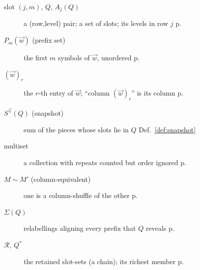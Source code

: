 \begin{description}
\item[slot $(j,m)$, $Q$, $A_j(Q)$] a (row,level) pair; a set of slots; its levels in row $j$ \dotfill p.~\pageref{def:slot}
\item[$P_m(\vec w)$ (prefix set)] the first $m$ symbols of $\vec w$, unordered \dotfill p.~\pageref{def:prefix}
\item[$(\vec w)_r$] the $r$-th entry of $\vec w$; ``column $(\vec w)_r$'' is its column \dotfill p.~\pageref{def:wr}
\item[$S^{\vec v}(Q)$ (snapshot)] sum of the pieces whose slots lie in $Q$ \dotfill Def.~\ref{def:snapshot}
\item[multiset] a collection with repeats counted but order ignored \dotfill p.~\pageref{def:multiset}
\item[$M\sim M'$ (column-equivalent)] one is a column-shuffle of the other \dotfill p.~\pageref{def:colequiv}
\item[$\Sigma(Q)$] relabellings aligning every prefix that $Q$ reveals \dotfill p.~\pageref{def:sigma}
\item[$\mathcal R$, $Q^\ast$] the retained slot-sets (a chain); its richest member \dotfill p.~\pageref{def:retained}
\end{description}

